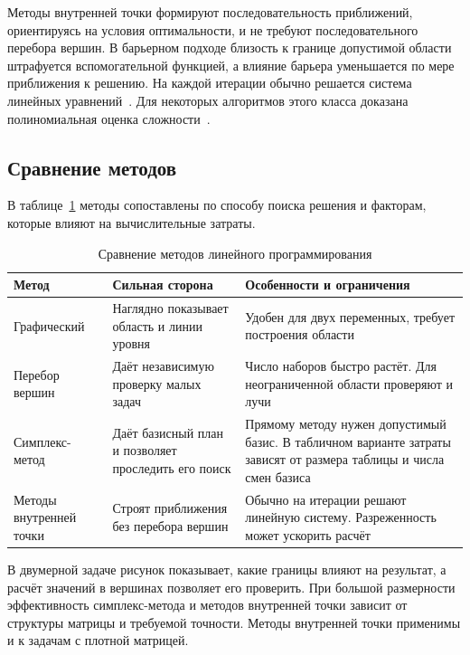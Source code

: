 Методы внутренней точки формируют последовательность приближений,
ориентируясь на условия оптимальности, и не требуют последовательного
перебора вершин. В барьерном подходе близость к границе допустимой
области штрафуется вспомогательной функцией, а влияние барьера
уменьшается по мере приближения к решению. На каждой итерации обычно
решается система линейных уравнений~\cite{boyd2004}. Для некоторых
алгоритмов этого класса доказана полиномиальная оценка
сложности~\cite{karmarkar1984}.

\subsection{Сравнение методов}

В таблице~\ref{tab:lp-methods} методы сопоставлены по способу поиска
решения и факторам, которые влияют на вычислительные затраты.

\begin{table}[htbp]
  \caption{Сравнение методов линейного программирования}
  \label{tab:lp-methods}
  \begin{tabularx}{\textwidth}{@{}>{\raggedright\arraybackslash}p{36mm}
      >{\raggedright\arraybackslash}X
      >{\raggedright\arraybackslash}X@{}}
    \toprule
    Метод & Сильная сторона & Особенности и ограничения \\
    \midrule
    Графический & Наглядно показывает область и линии уровня
      & Удобен для двух переменных, требует построения области \\
    Перебор вершин & Даёт независимую проверку малых задач
      & Число наборов быстро растёт. Для неограниченной области проверяют и лучи \\
    Симплекс-метод & Даёт базисный план и позволяет проследить его поиск
      & Прямому методу нужен допустимый базис. В табличном варианте затраты зависят от размера таблицы и числа смен базиса \\
    Методы внутренней точки & Строят приближения без перебора вершин
      & Обычно на итерации решают линейную систему. Разреженность может ускорить расчёт \\
    \bottomrule
  \end{tabularx}
\end{table}

В двумерной задаче рисунок показывает, какие границы влияют на
результат, а расчёт значений в вершинах позволяет его проверить.
При большой размерности эффективность симплекс-метода и методов
внутренней точки зависит от структуры матрицы и требуемой точности.
Методы внутренней точки применимы и к задачам с плотной матрицей.

